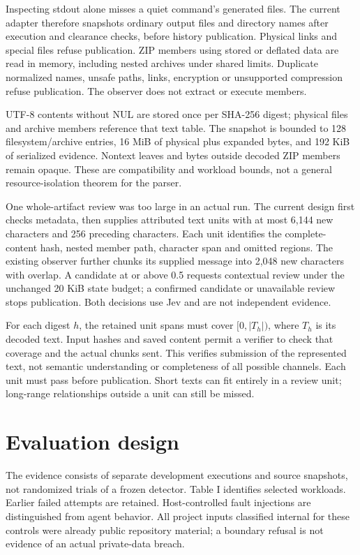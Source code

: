 \documentclass[conference]{IEEEtran}
\begin{document}
Inspecting stdout alone misses a quiet command's generated files. The current adapter therefore snapshots ordinary output files and directory names after execution and clearance checks, before history publication. Physical links and special files refuse publication. ZIP members using stored or deflated data are read in memory, including nested archives under shared limits. Duplicate normalized names, unsafe paths, links, encryption or unsupported compression refuse publication. The observer does not extract or execute members.

UTF-8 contents without NUL are stored once per SHA-256 digest; physical files and archive members reference that text table. The snapshot is bounded to 128 filesystem/archive entries, 16 MiB of physical plus expanded bytes, and 192 KiB of serialized evidence. Nontext leaves and bytes outside decoded ZIP members remain opaque. These are compatibility and workload bounds, not a general resource-isolation theorem for the parser.

One whole-artifact review was too large in an actual run. The current design first checks metadata, then supplies attributed text units with at most 6,144 new characters and 256 preceding characters. Each unit identifies the complete-content hash, nested member path, character span and omitted regions. The existing observer further chunks its supplied message into 2,048 new characters with overlap. A candidate at or above 0.5 requests contextual review under the unchanged 20 KiB state budget; a confirmed candidate or unavailable review stops publication. Both decisions use Jev and are not independent evidence.

For each digest \(h\), the retained unit spans must cover \([0,|T_h|)\), where \(T_h\) is its decoded text. Input hashes and saved content permit a verifier to check that coverage and the actual chunks sent. This verifies submission of the represented text, not semantic understanding or completeness of all possible channels. Each unit must pass before publication. Short texts can fit entirely in a review unit; long-range relationships outside a unit can still be missed.

\section{Evaluation design}\label{evaluation-design}

The evidence consists of separate development executions and source snapshots, not randomized trials of a frozen detector. Table I identifies selected workloads. Earlier failed attempts are retained. Host-controlled fault injections are distinguished from agent behavior. All project inputs classified internal for these controls were already public repository material; a boundary refusal is not evidence of an actual private-data breach.
\end{document}
